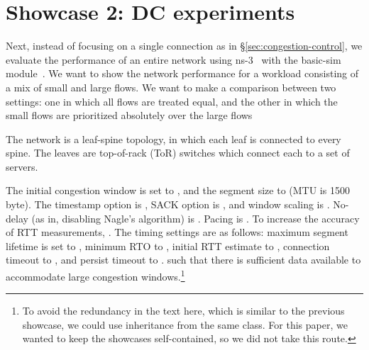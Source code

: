 \section{Showcase 2: DC experiments}
\label{sec:netload}

Next, instead of focusing on a single connection as in \S\ref{sec:congestion-control}, we evaluate the performance of an entire network using ns-3~\cite{ns3} with the basic-sim module~\cite{basic-sim}. We want to show the network performance for a workload consisting of a mix of small and large flows. We want to make a comparison between two settings: one in which all flows are treated equal, and the other in which the small flows are prioritized absolutely over the large flows

 The network is a leaf-spine topology, in which each leaf is connected to every spine. The leaves are top-of-rack (ToR) switches which connect each to a set of servers.    

  The initial congestion window is set to , and the segment size to  (MTU is 1500 byte). The timestamp option is , SACK option is , and window scaling is . No-delay (as in, disabling Nagle's algorithm) is . Pacing is . To increase the accuracy of RTT measurements, . The timing settings are as follows: maximum segment lifetime is set to , minimum RTO to , initial RTT estimate to , connection timeout to , and persist timeout to .  such that there is sufficient data available to accommodate large congestion windows.\footnote{To avoid the redundancy in the text here, which is similar to the previous showcase, we could use inheritance from the same class. For this paper, we wanted to keep the showcases self-contained, so we did not take this route.}

